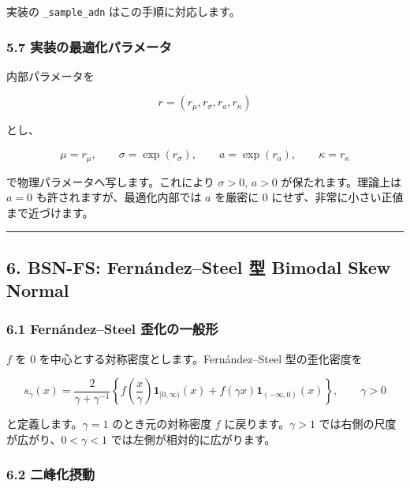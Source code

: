 \documentclass[
]{article}
\begin{document}
実装の \texttt{\_sample\_adn} はこの手順に対応します。

\hypertarget{ux5b9fux88c5ux306eux6700ux9069ux5316ux30d1ux30e9ux30e1ux30fcux30bf-1}{%
\subsubsection{5.7
実装の最適化パラメータ}\label{ux5b9fux88c5ux306eux6700ux9069ux5316ux30d1ux30e9ux30e1ux30fcux30bf-1}}

内部パラメータを

\[
r=(r_\mu,r_\sigma,r_a,r_\kappa)
\]

とし、

\[
\mu=r_\mu,
\qquad
\sigma=\exp(r_\sigma),
\qquad
a=\exp(r_a),
\qquad
\kappa=r_\kappa
\]

で物理パラメータへ写します。これにより \(\sigma>0\), \(a>0\)
が保たれます。理論上は \(a=0\) も許されますが、最適化内部では \(a\)
を厳密に 0 にせず、非常に小さい正値まで近づけます。

\begin{center}\rule{0.5\linewidth}{0.5pt}\end{center}

\hypertarget{bsn-fs-fernuxe1ndezsteel-ux578b-bimodal-skew-normal}{%
\subsection{6. BSN-FS: Fernández--Steel 型 Bimodal Skew
Normal}\label{bsn-fs-fernuxe1ndezsteel-ux578b-bimodal-skew-normal}}

\hypertarget{fernuxe1ndezsteel-ux6b6aux5316ux306eux4e00ux822cux5f62}{%
\subsubsection{6.1 Fernández--Steel
歪化の一般形}\label{fernuxe1ndezsteel-ux6b6aux5316ux306eux4e00ux822cux5f62}}

\(f\) を 0 を中心とする対称密度とします。Fernández--Steel 型の歪化密度を

\[
s_\gamma(x)
=\frac{2}{\gamma+\gamma^{-1}}
\left\{
 f\left(\frac{x}{\gamma}\right)\mathbf{1}_{[0,\infty)}(x)
 +f(\gamma x)\mathbf{1}_{(-\infty,0)}(x)
\right\},
\qquad
\gamma>0
\]

と定義します。\(\gamma=1\) のとき元の対称密度 \(f\)
に戻ります。\(\gamma>1\) では右側の尺度が広がり、\(0<\gamma<1\)
では左側が相対的に広がります。

\hypertarget{ux4e8cux5cf0ux5316ux6442ux52d5}{%
\subsubsection{6.2 二峰化摂動}\label{ux4e8cux5cf0ux5316ux6442ux52d5}}
\end{document}
